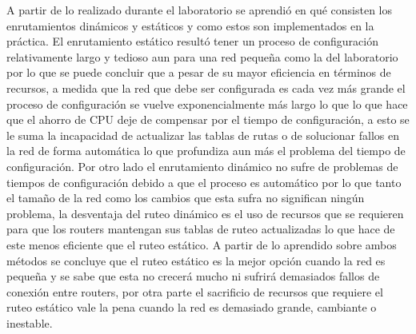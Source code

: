 ﻿\documentclass[spanish]{udpreport}
\begin{document}
 A partir de lo realizado durante el laboratorio se aprendió en qué consisten los enrutamientos dinámicos y estáticos y como estos son implementados en la práctica. El enrutamiento estático resultó tener un proceso de configuración relativamente largo y tedioso aun para una red pequeña como la del laboratorio por lo que se puede concluir que a pesar de su mayor eficiencia en términos de recursos, a medida que la red que debe ser configurada es cada vez más grande el proceso de configuración se vuelve exponencialmente más largo lo que lo que hace que el ahorro de CPU deje de compensar por el tiempo de configuración, a esto se le suma la incapacidad de actualizar las tablas de rutas o de solucionar fallos en la red de forma automática lo que profundiza aun más el problema del tiempo de configuración. Por otro lado el enrutamiento dinámico no sufre de problemas de tiempos de configuración debido a que el proceso es automático por lo que tanto el tamaño de la red como los cambios que esta sufra no significan ningún problema, la desventaja del ruteo dinámico es el uso de recursos que se requieren para que los routers mantengan sus tablas de ruteo actualizadas lo que hace de este menos eficiente que el ruteo estático. A partir de lo aprendido sobre ambos métodos se concluye que el ruteo estático es la mejor opción cuando la red es pequeña y se sabe que esta no crecerá mucho ni sufrirá demasiados fallos de conexión entre routers, por otra parte el sacrificio de recursos que requiere el ruteo estático vale la pena cuando la red es demasiado grande, cambiante o inestable.



\listoffigures
\end{document}
